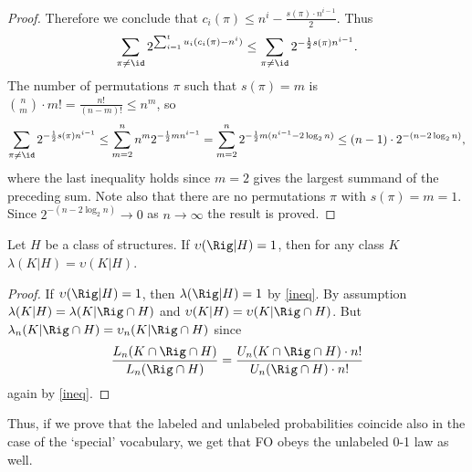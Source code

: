 \begin{lem}
\begin{proof}
Therefore we conclude that $c_i(\pi) \le n^i - \frac{s(\pi) \cdot n^{i-1}}{2}$. 
Thus
$$\sum_{\pi \neq \id} 2^{\sum_{i=1} ^t u_i (c_i(\pi)-n^i)} \le \sum_{\pi \neq \id} 2^{-\frac{1}{2}s(\pi)n^{i-1}}\text{.}$$
The number of permutations $\pi$ such that $s(\pi)=m$ is $\binom{n}{m} \cdot m!=\frac{n!}{(n-m)!}\le n^m$, so 
$$\sum_{\pi \neq \id} 2^{-\frac{1}{2}s(\pi)n^{i-1}} \le \sum^n _{m=2} n^m 2^{-\frac{1}{2}mn^{i-1}}= \sum^n _{m=2} 2^{-\frac{1}{2}m (n^{i-1} -2 \log_2 n)} \le (n-1) \cdot 2^{-(n-2 \log_2 n)}\text{,}$$
where the last inequality holds since $m=2$ gives the largest summand of the preceding sum. 
Note also that there are no permutations $\pi$ with $s(\pi)=m=1$. 
Since $2^{-(n-2 \log_2 n)} \to 0$ as $n \to \infty$ the result is proved.
\end{proof}
\end{lem} 

\begin{thm} Let $H$ be a class of structures. If $\upsilon(\Rig|H)=1$, then for any class $K$ $\lambda(K|H)=\upsilon(K|H)$. 
\begin{proof} If $\upsilon(\Rig|H)=1$, then $\lambda(\Rig|H)=1$ by \ref{ineq}. By assumption $\lambda(K|H)=\lambda(K|\Rig \cap H)$ and $\upsilon(K|H)=\upsilon(K|\Rig \cap H)$. But $\lambda_n(K|\Rig \cap H)=\upsilon_n(K|\Rig \cap H)$ since 
$$\frac{L_n(K \cap \Rig \cap H)}{L_n(\Rig \cap H)}=\frac{U_n(K \cap \Rig \cap H) \cdot n!}{U_n(\Rig \cap H) \cdot n!}$$ again by \ref{ineq}.
\end{proof}
\end{thm} 

Thus, if we prove that the labeled and unlabeled probabilities coincide also in the case of the `special' vocabulary, we get that FO obeys the unlabeled 0-1 law as well. 

